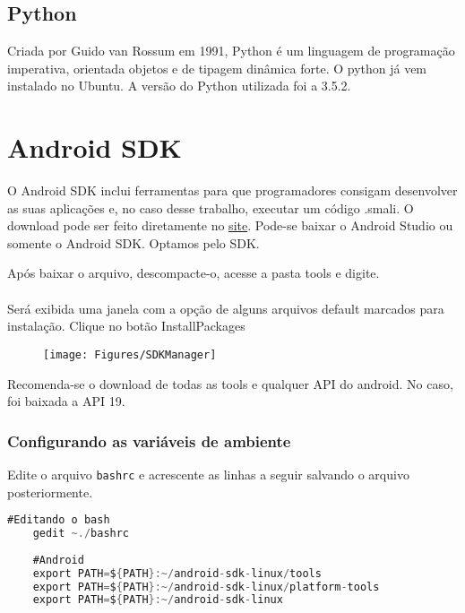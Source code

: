 \documentclass[hidelinks,12pt]{article}
\begin{document}
	\subsection{Python}
	
	Criada por Guido van Rossum em 1991, Python é um linguagem de programação imperativa, orientada objetos e de tipagem dinâmica forte.
	O python já vem instalado no Ubuntu.
	A versão do Python utilizada foi a 3.5.2.
	
	\section{Android SDK}
	
	O Android SDK inclui ferramentas para que programadores consigam desenvolver as suas aplicações e, no caso desse trabalho, executar um código .smali. O download pode ser feito diretamente no \href{https://developer.android.com/studio/index.html#tos-header}{\color{blue}site}. Pode-se baixar o Android Studio ou somente o Android SDK. Optamos pelo SDK. 
	
	Após baixar o arquivo, descompacte-o, acesse a pasta tools e digite.\\
	
	\noindent{}\\
	
	Será exibida uma janela com a opção de alguns arquivos default marcados para instalação. Clique no botão InstallPackages 
	\newpage
	\begin{figure}[h!]
		\centering
		\texttt{[image: Figures/SDKManager]}
	\end{figure}
	
	Recomenda-se o download de todas as tools e qualquer API do android. No caso, foi baixada a API 19.
	
	\subsubsection{Configurando as variáveis de ambiente}
	
	
	
	Edite o arquivo \texttt{bashrc} e acrescente as linhas a seguir salvando o arquivo posteriormente.\\
	
	\begin{lstlisting}[caption=Variáveis android de ambiente,language=java]
	#Editando o bash
	gedit ~./bashrc
	
	#Android
	export PATH=${PATH}:~/android-sdk-linux/tools
	export PATH=${PATH}:~/android-sdk-linux/platform-tools
	export PATH=${PATH}:~/android-sdk-linux
	
	\end{lstlisting}
	
\end{document}
